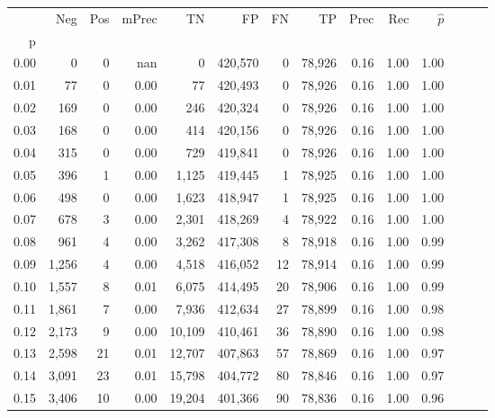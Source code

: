 \begin{tabular}{rrrrrrrrrrrrrr}
\toprule
{} &    Neg &    Pos & mPrec &       TN &       FP &      FN &      TP &  Prec &   Rec & $\hat{p}$ \\
p    &        &        &       &          &          &         &         &       &       &           \\
\midrule
0.00 &      0 &      0 &   nan &        0 &  420,570 &       0 &  78,926 &  0.16 &  1.00 &      1.00 \\
0.01 &     77 &      0 &  0.00 &       77 &  420,493 &       0 &  78,926 &  0.16 &  1.00 &      1.00 \\
0.02 &    169 &      0 &  0.00 &      246 &  420,324 &       0 &  78,926 &  0.16 &  1.00 &      1.00 \\
0.03 &    168 &      0 &  0.00 &      414 &  420,156 &       0 &  78,926 &  0.16 &  1.00 &      1.00 \\
0.04 &    315 &      0 &  0.00 &      729 &  419,841 &       0 &  78,926 &  0.16 &  1.00 &      1.00 \\
0.05 &    396 &      1 &  0.00 &    1,125 &  419,445 &       1 &  78,925 &  0.16 &  1.00 &      1.00 \\
0.06 &    498 &      0 &  0.00 &    1,623 &  418,947 &       1 &  78,925 &  0.16 &  1.00 &      1.00 \\
0.07 &    678 &      3 &  0.00 &    2,301 &  418,269 &       4 &  78,922 &  0.16 &  1.00 &      1.00 \\
0.08 &    961 &      4 &  0.00 &    3,262 &  417,308 &       8 &  78,918 &  0.16 &  1.00 &      0.99 \\
0.09 &  1,256 &      4 &  0.00 &    4,518 &  416,052 &      12 &  78,914 &  0.16 &  1.00 &      0.99 \\
0.10 &  1,557 &      8 &  0.01 &    6,075 &  414,495 &      20 &  78,906 &  0.16 &  1.00 &      0.99 \\
0.11 &  1,861 &      7 &  0.00 &    7,936 &  412,634 &      27 &  78,899 &  0.16 &  1.00 &      0.98 \\
0.12 &  2,173 &      9 &  0.00 &   10,109 &  410,461 &      36 &  78,890 &  0.16 &  1.00 &      0.98 \\
0.13 &  2,598 &     21 &  0.01 &   12,707 &  407,863 &      57 &  78,869 &  0.16 &  1.00 &      0.97 \\
0.14 &  3,091 &     23 &  0.01 &   15,798 &  404,772 &      80 &  78,846 &  0.16 &  1.00 &      0.97 \\
0.15 &  3,406 &     10 &  0.00 &   19,204 &  401,366 &      90 &  78,836 &  0.16 &  1.00 &      0.96 \\

\end{tabular}
